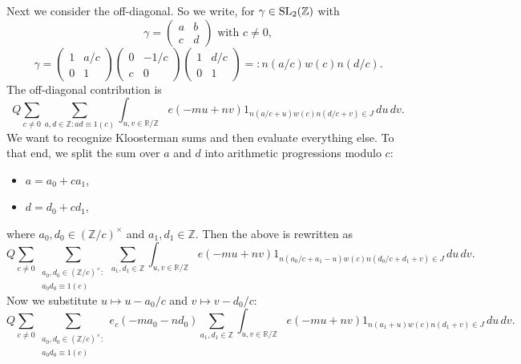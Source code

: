 \documentclass[reqno]{amsart} 
\begin{document}
Next we consider the off-diagonal.  So we write, for $\gamma \in \operatorname{SL}_2(\mathbb{Z})$ with
\begin{equation*}
  \gamma =
  \begin{pmatrix}
    a & b \\
    c & d
  \end{pmatrix} \text{ with } c \neq 0,
\end{equation*}
\begin{equation*}
  \gamma =
  \begin{pmatrix}
    1 & a/c \\
    0 & 1
  \end{pmatrix}
  \begin{pmatrix}
    0 & -1/c \\
    c & 0
  \end{pmatrix}
  \begin{pmatrix}
    1 & d/c \\
    0 & 1
  \end{pmatrix}
  =:
  n(a/c) w(c) n(d/c).
\end{equation*}
The off-diagonal contribution is
\begin{equation*}
  Q
  \sum _{c \neq 0}
  \sum _{a, d \in \mathbb{Z} : a d \equiv 1(c)}
  \int _{u, v \in \mathbb{R} / \mathbb{Z} }
  e (- m u + n v )
  1 _{
    n(a/c+u) w(c) n(d/c + v)
    \in
    J
  }
  \,d u \, d v.
\end{equation*}
We want to recognize Kloosterman sums and then evaluate everything else.  To that end, we split the sum over $a$ and $d$ into arithmetic progressions modulo $c$:
\begin{itemize}
\item $a = a_0 + c a_1$,
\item $d = d_0 + c d_1$,
\end{itemize}
where $a_0, d_0 \in (\mathbb{Z} / c)^\times$ and $a_1, d_1 \in \mathbb{Z}$.  Then the above is rewritten as
\begin{equation*}
  Q \sum _{c \neq 0} \sum _{
    \substack{
      a_0, d_0 \in (\mathbb{Z} / c)^\times :  \\
       a_0 d_0 \equiv  1(c)
    }
  }
  \sum _{a_1, d_1 \in \mathbb{Z} }
  \int _{u, v \in \mathbb{R} / \mathbb{Z} }
  e (- mu + n v )
  1 _{n (a_0/c +  a_1 - u) w(c) n(d_0/c + d_1 + v) \in J
  }
  \, d u \, d v.
\end{equation*}
Now we substitute $u \mapsto u - a_0/c$ and $v \mapsto v - d_0/c$:
\begin{equation*}
  Q \sum _{c \neq 0} \sum _{
    \substack{
      a_0, d_0 \in (\mathbb{Z} / c)^\times :  \\
       a_0 d_0 \equiv  1(c)
    }
  }
  e_c(-m a_0 - n d_0)
  \sum _{a_1, d_1 \in \mathbb{Z} }
  \int _{u, v \in \mathbb{R} / \mathbb{Z} }
  e (- mu + n v )
  1 _{n (a_1 + u) w(c) n(d_1 + v) \in J
  }
  \, d u \, d v.
\end{equation*}
\end{document}
